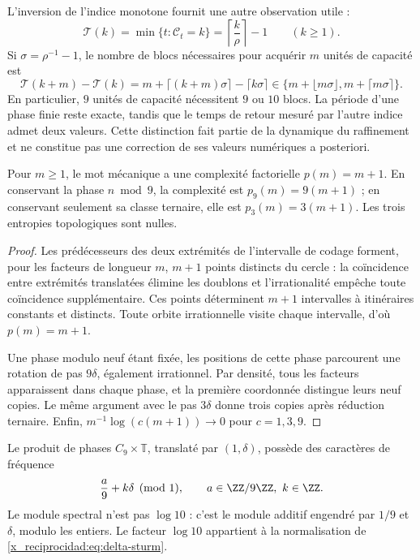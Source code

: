 L'inversion de l'indice monotone fournit une autre observation utile :
\[
 \mathcal T(k)=\min\{t:\mathcal C_t=k\}
   =\left\lceil\frac k\rho\right\rceil-1\qquad(k\geq1).
\]
Si \(\sigma=\rho^{-1}-1\), le nombre de blocs nécessaires pour acquérir
\(m\) unités de capacité est
\[
 \mathcal T(k+m)-\mathcal T(k)
 =m+\lceil(k+m)\sigma\rceil-\lceil k\sigma\rceil
 \in\{m+\lfloor m\sigma\rfloor,m+\lceil m\sigma\rceil\}.
\]
En particulier, \(9\) unités de capacité nécessitent \(9\) ou \(10\)
blocs. La période d'une phase finie reste exacte, tandis que le
temps de retour mesuré par l'autre indice admet deux valeurs. Cette
distinction fait partie de la dynamique du raffinement et ne constitue pas une correction
de ses valeurs numériques a posteriori.



\begin{theorem}
Pour \(m\ge1\), le mot mécanique a une complexité factorielle \(p(m)=m+1\). En conservant la phase \(n\bmod9\), la complexité est \(p_9(m)=9(m+1)\) ; en conservant seulement sa classe ternaire, elle est \(p_3(m)=3(m+1)\). Les trois entropies topologiques sont nulles.
\end{theorem}
\begin{proof}
Les prédécesseurs des deux extrémités de l'intervalle de codage forment, pour les facteurs de longueur \(m\), \(m+1\) points distincts du cercle : la coïncidence entre extrémités translatées élimine les doublons et l'irrationalité empêche toute coïncidence supplémentaire. Ces points déterminent \(m+1\) intervalles à itinéraires constants et distincts. Toute orbite irrationnelle visite chaque intervalle, d'où \(p(m)=m+1\).

Une phase modulo neuf étant fixée, les positions de cette phase parcourent une rotation de pas \(9\delta\), également irrationnel. Par densité, tous les facteurs apparaissent dans chaque phase, et la première coordonnée distingue leurs neuf copies. Le même argument avec le pas \(3\delta\) donne trois copies après réduction ternaire. Enfin, \(m^{-1}\log(c(m+1))\to0\) pour \(c=1,3,9\).
\end{proof}

Le produit de phases \(C_9\times\mathbb T\), translaté par \((1,\delta)\), possède des caractères de fréquence
\[
 \frac a9+k\delta\pmod1,\qquad a\in\ZZ/9\ZZ,\ k\in\ZZ.
\]
Le module spectral n'est pas \(\log10\) : c'est le module additif engendré par \(1/9\) et \(\delta\), modulo les entiers. Le facteur \(\log10\) appartient à la normalisation de \eqref{x_reciprocidad:eq:delta-sturm}.

